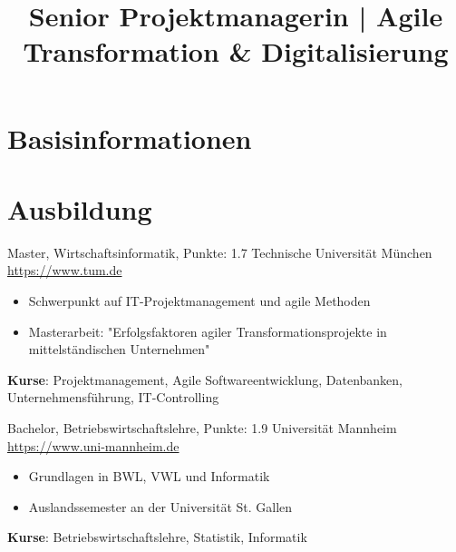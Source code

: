 \documentclass[a4paper, serif, 10pt]{moderncv}
\title{Senior Projektmanagerin | Agile Transformation \& Digitalisierung}
\begin{document}
\maketitle

\section{Basisinformationen}

\section{Ausbildung}

        {Master, Wirtschaftsinformatik, Punkte: 1.7}
        {Technische Universität München}
        {\url{https://www.tum.de}}
        {}
        {\begin{itemize}
\item Schwerpunkt auf IT-Projektmanagement und agile Methoden
\item Masterarbeit: "Erfolgsfaktoren agiler Transformationsprojekte in mittelständischen Unternehmen"
\end{itemize}
\textbf{Kurse}: Projektmanagement, Agile Softwareentwicklung, Datenbanken, Unternehmensführung, IT-Controlling}

        {Bachelor, Betriebswirtschaftslehre, Punkte: 1.9}
        {Universität Mannheim}
        {\url{https://www.uni-mannheim.de}}
        {}
        {\begin{itemize}
\item Grundlagen in BWL, VWL und Informatik
\item Auslandssemester an der Universität St. Gallen
\end{itemize}
\textbf{Kurse}: Betriebswirtschaftslehre, Statistik, Informatik}
\end{document}
